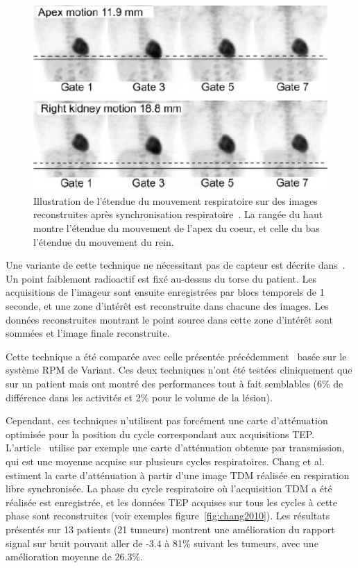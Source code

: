 \begin{figure}[h!]
	\begin{center}
		\includegraphics[width=12cm]{images/gatingBoucher2004}
	\end{center}
	\caption[Illustration de l'étendue du mouvement respiratoire sur des images reconstruites ]{Illustration de l'étendue du mouvement respiratoire sur des images reconstruites après synchronisation respiratoire~\cite{boucher2004respiratory}. La rangée du haut montre l'étendue du mouvement de l'apex du coeur, et celle du bas l'étendue du mouvement du rein.} 
	\label{fig:boucher2004}
\end{figure}

Une variante de cette technique ne nécessitant pas de capteur est décrite dans~\cite{nehmeh2003reduction}. Un point faiblement radioactif est fixé au-dessus du torse du patient. Les acquisitions de l'imageur sont ensuite enregistrées par blocs temporels de 1 seconde, et une zone d'intérêt est reconstruite dans chacune des images. Les données reconstruites montrant le point source dans cette zone d'intérêt sont sommées et l'image finale reconstruite. 

Cette technique a été comparée avec celle présentée précédemment~\cite{nehmeh2002effect} basée sur le système RPM de Variant. Ces deux techniques n'ont été testées cliniquement que sur un patient mais ont montré des performances tout à fait semblables (6\% de différence dans les activités et 2\% pour le volume de la lésion).

Cependant, ces techniques n'utilisent pas forcément une carte d'atténuation optimisée pour la position du cycle correspondant aux acquisitions TEP. L'article~\cite{boucher2004respiratory} utilise par exemple une carte d'atténuation obtenue par transmission, qui est une moyenne acquise sur plusieurs cycles respiratoires. Chang et al.~\cite{GuopingChang2010Implementation} estiment la carte d'atténuation à partir d'une image TDM réalisée en respiration libre synchronisée. La phase du cycle respiratoire où l'acquisition TDM a été réalisée est enregistrée, et les données TEP acquises sur tous les cycles à cette phase sont reconstruites (voir exemples figure~\ref{fig:chang2010}). Les résultats présentés sur 13 patients (21 tumeurs) montrent une amélioration du rapport signal sur bruit pouvant aller de -3.4 à 81\% suivant les tumeurs, avec une amélioration moyenne de 26.3\%.

